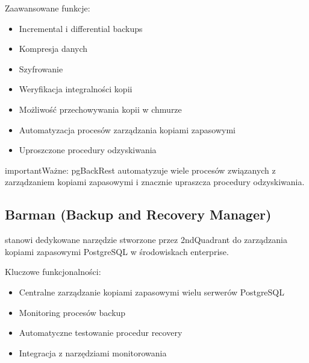 \documentclass[a4paper,11pt,polish]{sphinxmanual}
\begin{document}
\sphinxAtStartPar
Zaawansowane funkcje:
\begin{itemize}
\item {} 
\sphinxAtStartPar
Incremental i differential backups

\item {} 
\sphinxAtStartPar
Kompresja danych

\item {} 
\sphinxAtStartPar
Szyfrowanie

\item {} 
\sphinxAtStartPar
Weryfikacja integralności kopii

\item {} 
\sphinxAtStartPar
Możliwość przechowywania kopii w chmurze

\item {} 
\sphinxAtStartPar
Automatyzacja procesów zarządzania kopiami zapasowymi

\item {} 
\sphinxAtStartPar
Uproszczone procedury odzyskiwania

\end{itemize}

\begin{sphinxadmonition}{important}{Ważne:}
\sphinxAtStartPar
pgBackRest automatyzuje wiele procesów związanych z zarządzaniem kopiami zapasowymi i znacznie upraszcza procedury odzyskiwania.
\end{sphinxadmonition}


\subsection{Barman (Backup and Recovery Manager)}
\label{\detokenize{Kopie_zapasowe_i_odzyskiwanie_danych/kopie_zapasowe_i_odzyskiwanie_danych:barman-backup-and-recovery-manager}}
\sphinxAtStartPar
{} stanowi dedykowane narzędzie stworzone przez 2ndQuadrant do zarządzania kopiami zapasowymi PostgreSQL w środowiskach enterprise.

\sphinxAtStartPar
Kluczowe funkcjonalności:
\begin{itemize}
\item {} 
\sphinxAtStartPar
Centralne zarządzanie kopiami zapasowymi wielu serwerów PostgreSQL

\item {} 
\sphinxAtStartPar
Monitoring procesów backup

\item {} 
\sphinxAtStartPar
Automatyczne testowanie procedur recovery

\item {} 
\sphinxAtStartPar
Integracja z narzędziami monitorowania

\end{itemize}
\end{document}

